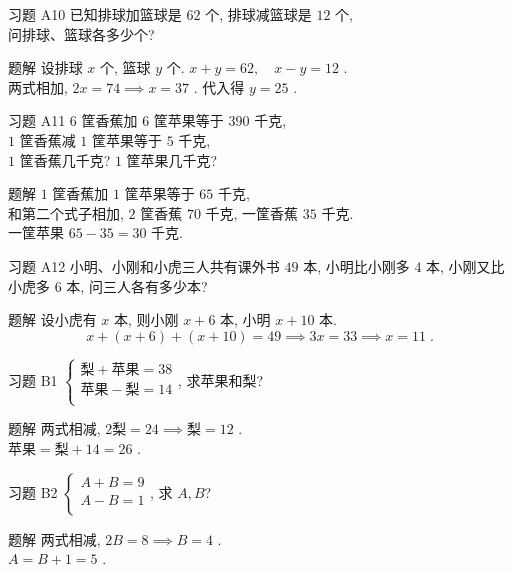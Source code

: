 \documentclass[content.tex]{subfiles}
\begin{document}
\begin{frame}{习题 A10}
已知排球加篮球是 $62$ 个, 排球减篮球是 $12$ 个, \\
问排球、篮球各多少个?
\begin{exampleblock}{题解}
设排球 $x$ 个, 篮球 $y$ 个. $x + y = 62,\quad x - y = 12$ . \\
两式相加, $2x=74\implies x = 37$ . 代入得 $y = 25$ .
\end{exampleblock}
\end{frame}

\begin{frame}{习题 A11}
$6$ 筐香蕉加 $6$ 筐苹果等于 $390$ 千克, \\
$1$ 筐香蕉减 $1$ 筐苹果等于 $5$ 千克, \\
$1$ 筐香蕉几千克? $1$ 筐苹果几千克?
\begin{exampleblock}{题解}
$1$ 筐香蕉加 $1$ 筐苹果等于 $65$ 千克, \\
和第二个式子相加, $2$ 筐香蕉 $70$ 千克, 一筐香蕉 $35$ 千克.\\
一筐苹果 $65-35=30$ 千克.
\end{exampleblock}
\end{frame}

\begin{frame}{习题 A12}
小明、小刚和小虎三人共有课外书 $49$ 本, 小明比小刚多 $4$ 本, 小刚又比小虎多 $6$ 本, 问三人各有多少本?
\begin{exampleblock}{题解}
设小虎有 $x$ 本, 则小刚 $x + 6$ 本, 小明 $x + 10$ 本.
$$x+(x+6)+(x+10) = 49\implies 3x=33\implies x = 11\;.$$
\end{exampleblock}
\end{frame}

\begin{frame}{习题 B1}
$
\begin{cases}
\text{梨}+\text{苹果} = 38\\
\text{苹果}-\text{梨} = 14\\
\end{cases}
$, 求苹果和梨? 
\begin{exampleblock}{题解}
两式相减, $2\text{梨}=24\implies \text{梨} = 12$ . \\
$\text{苹果} = \text{梨} + 14 = 26$ .
\end{exampleblock}
\end{frame}

\begin{frame}{习题 B2}
$
\begin{cases}
A + B = 9\\
A - B = 1\\
\end{cases}
$, 求 $A, B$? 
\begin{exampleblock}{题解}
两式相减, $2B=8\implies B=4$ . \\
$A = B + 1 = 5$ .
\end{exampleblock}
\end{frame}
\end{document}
